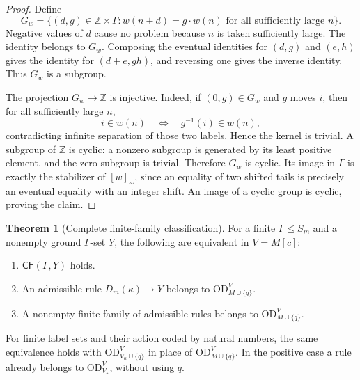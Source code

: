 \documentclass[11pt,letterpaper]{article}
\theoremstyle{definition}
\newtheorem{theorem}[definition]{Theorem}
\numberwithin{equation}{section}
\newcommand{\OD}{\mathrm{OD}}
\newcommand{\CF}{\mathsf{CF}}
\newcommand{\ZZ}{\mathbb Z}
\newcommand{\ODg}{\OD_{M\cup\{q\}}^{V}}
\newcommand{\ODlow}{\OD_{V_\kappa\cup\{q\}}^{V}}
\begin{document}
\begin{proof}
Define
\[
 G_w=\{(d,g)\in\ZZ\times\Gamma:
        w(n+d)=g\cdot w(n)\text{ for all sufficiently large }n\}.
\]
Negative values of $d$ cause no problem because $n$ is taken sufficiently
large. The identity belongs to $G_w$. Composing the eventual identities
for $(d,g)$ and $(e,h)$ gives the identity for $(d+e,gh)$, and reversing
one gives the inverse identity. Thus $G_w$ is a subgroup.

The projection $G_w\to\ZZ$ is injective. Indeed, if $(0,g)\in G_w$ and
$g$ moves $i$, then for all sufficiently large $n$,
\[
 i\in w(n)\quad\Longleftrightarrow\quad g^{-1}(i)\in w(n),
\]
contradicting infinite separation of those two labels. Hence the kernel
is trivial. A subgroup of $\ZZ$ is cyclic: a nonzero subgroup is generated
by its least positive element, and the zero subgroup is trivial.
Therefore $G_w$ is cyclic. Its image in $\Gamma$ is exactly the stabilizer
of $[w]_\sim$, since an equality of two shifted tails is precisely an
eventual equality with an integer shift. An image of a cyclic group is
cyclic, proving the claim.
\end{proof}

\begin{theorem}[Complete finite-family classification]\label{thm:classification}
For a finite $\Gamma\le S_m$ and a nonempty ground $\Gamma$-set $Y$, the
following are equivalent in $V=M[c]$:
\begin{enumerate}
\item $\CF(\Gamma,Y)$ holds.
\item An admissible rule $D_m(\kappa)\to Y$ belongs to $\ODg$.
\item A nonempty finite family of admissible rules belongs to $\ODg$.
\end{enumerate}
For finite label sets and their action coded by natural numbers, the same
equivalence holds with $\ODlow$ in place of $\ODg$. In the positive case
a rule already belongs to $\OD_{V_\kappa}^V$, without using $q$.
\end{theorem}
\end{document}
